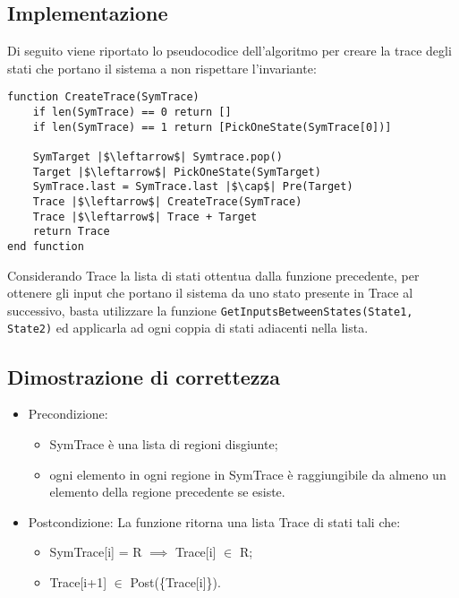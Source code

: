 \documentclass[12pt]{article}
\begin{document}
    \subsection{Implementazione}
    Di seguito viene riportato lo pseudocodice dell'algoritmo per creare la trace degli stati che portano il sistema a non rispettare l'invariante:
    \begin{verbatim}
function CreateTrace(SymTrace)
    if len(SymTrace) == 0 return []
    if len(SymTrace) == 1 return [PickOneState(SymTrace[0])]

    SymTarget |$\leftarrow$| Symtrace.pop()
    Target |$\leftarrow$| PickOneState(SymTarget)
    SymTrace.last = SymTrace.last |$\cap$| Pre(Target)
    Trace |$\leftarrow$| CreateTrace(SymTrace)
    Trace |$\leftarrow$| Trace + Target
    return Trace
end function
    \end{verbatim}
    Considerando Trace la lista di stati ottentua dalla funzione precedente, per ottenere gli input che portano il sistema da uno stato presente in Trace al successivo, basta utilizzare la funzione \texttt{GetInputsBetweenStates(State1, State2)} ed applicarla ad ogni coppia di stati adiacenti nella lista.
    
    \subsection{Dimostrazione di correttezza}
    \begin{itemize}
        \item Precondizione:
            \begin{itemize}
                \item SymTrace è una lista di regioni disgiunte;
                \item ogni elemento in ogni regione in SymTrace è raggiungibile da almeno un elemento della regione precedente se esiste.
            \end{itemize}
        \item Postcondizione: La funzione ritorna una lista Trace di stati tali che:
        \begin{itemize}
            \item SymTrace[i] = R $\implies$ Trace[i] $\in$ R;
            \item Trace[i+1] $\in$ Post(\{Trace[i]\}).
        \end{itemize}
    \end{itemize}
\end{document}

